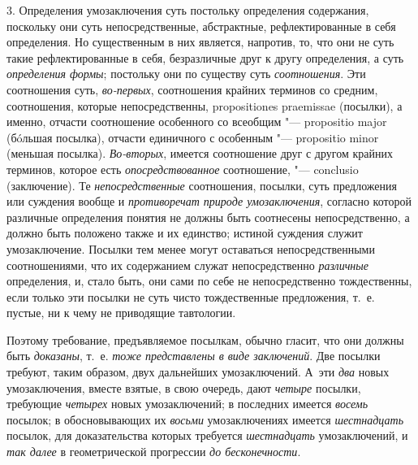 3. Определения умозаключения суть постольку определения
содержания, поскольку они суть непосредственные, абстрактные,
рефлектированные в себя определения. Но существенным в них является,
напротив, то, что они не суть такие рефлектированные в себя, безразличные
друг к другу определения, а суть
{\em определения формы};
постольку они по существу суть
{\em соотношения}. Эти
соотношения суть, {\em во-первых},
соотношения крайних терминов со средним, соотношения, которые
непосредственны, propositiones praemissae (посылки), а
именно, отчасти соотношение особенного со всеобщим "--- propositio major
(бóльшая посылка), отчасти единичного с особенным "---
propositio minor (меньшая посылка).
{\em Во-вторых}, имеется
соотношение друг с другом крайних терминов, которое есть
{\em опосредствованное}
соотношение, "--- conclusio (заключение). Те
{\em непосредственные}
соотношения, посылки, суть предложения или суждения вообще и
{\em противоречат природе
умозаключения}, согласно которой различные определения
понятия не должны быть соотнесены непосредственно, а должно быть положено
также и их единство; истиной суждения служит умозаключение. Посылки тем
менее могут оставаться непосредственными соотношениями, что их содержанием
служат непосредственно {\em различные}
определения, и, стало быть, они сами по себе не
непосредственно тождественны, если только эти посылки не суть чисто
тождественные предложения, т.~е. пустые, ни к чему не приводящие
тавтологии.

Поэтому требование, предъявляемое посылкам, обычно гласит, что
они должны быть {\em доказаны},
т.~е. {\em тоже
представлены в виде заключений}. Две посылки требуют, таким
образом, двух дальнейших умозаключений. А~эти
{\em два} новых
умозаключения, вместе взятые, в свою очередь, дают
{\em четыре} посылки,
требующие {\em четырех}
новых умозаключений; в последних имеется
{\em восемь} посылок; в
обосновывающих их {\em восьми}
умозаключениях имеется
{\em шестнадцать}
посылок, для доказательства которых требуется
{\em шестнадцать}
умозаключений, и {\em так
далее} в геометрической прогрессии
{\em до бесконечности}.

